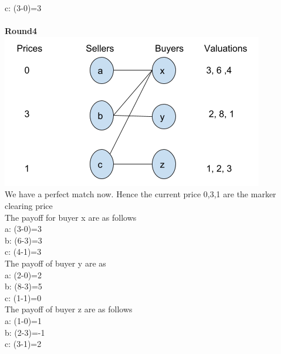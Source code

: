 \documentclass[]{article}
\begin{document}
c: (3-0)=3\\\\
\textbf{Round4}\\
\includegraphics[scale=.5]{9r4.png}\\
We have a perfect match now. Hence the current price 0,3,1 are the marker clearing price\\
The payoff for buyer x are as follows \\
a: (3-0)=3\\
b: (6-3)=3\\
c: (4-1)=3\\
The payoff of buyer y are as \\
a: (2-0)=2\\
b: (8-3)=5\\
c: (1-1)=0\\
The payoff of buyer z are as follows\\
a: (1-0)=1\\
b: (2-3)=-1\\
c: (3-1)=2\\\\
\end{document}

